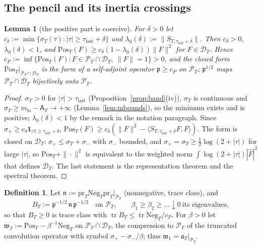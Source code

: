 \documentclass[11pt]{amsart}
\newtheorem{lemma}[theorem]{Lemma}
\theoremstyle{definition}
\newtheorem{definition}[theorem]{Definition}
\theoremstyle{remark}
\newcommand{\PT}{\mathcal P_T}
\newcommand{\sT}{\sigma_T}
\newcommand{\Fh}{\widehat F}
\newcommand{\Aconst}{\mathsf A_T}
\begin{document}
\subsection{The pencil and its inertia crossings}\label{subsec:wh-pencil}

\begin{lemma}[the positive part is coercive]\label{lem:wh-cP}
For $\delta>0$ let $c_\delta:=\min\{\sT(\tau):|\tau|\ge\tau_{\mathrm{last}}+\delta\}$ and
$\lambda_0(\delta):=\|S_{T,\tau_{\mathrm{last}}+\delta}\|$. Then $c_\delta>0$, $\lambda_0(\delta)<1$, and
$\mathrm{Pos}_T(F)\ge c_\delta(1-\lambda_0(\delta))\|F\|^2$ for $F\in\mathcal D_T$. Hence
$c_P:=\inf\{\mathrm{Pos}_T(F):F\in\PT\cap\mathcal D_T,\ \|F\|=1\}>0$, and the closed form $\mathrm{Pos}_T|_{\PT\cap\mathcal D_T}$
is the form of a self-adjoint operator $\mathfrak p\ge c_P$ on $\PT$; $\mathfrak p^{1/2}$ maps $\PT\cap\mathcal D_T$
bijectively onto $\PT$.
\end{lemma}

\begin{proof}
$\sT>0$ for $|\tau|>\tau_{\mathrm{last}}$ (Proposition~\ref{prop:band}(iv)), $\sT$ is continuous and
$\sT\ge m_{\mathrm{lo}}-\Aconst\to+\infty$ (Lemma~\ref{lem:mbounds}), so the minimum exists and is positive;
$\lambda_0(\delta)<1$ by the remark in the notation paragraph. Since
$\sigma_+\ge c_\delta\mathbf 1_{|\tau|\ge\tau_{\mathrm{last}}+\delta}$,
$\mathrm{Pos}_T(F)\ge c_\delta(\|F\|^2-\langle S_{T,\tau_{\mathrm{last}}+\delta}F,F\rangle)$. The form is closed on
$\mathcal D_T$: $\sigma_+\le\sT+\sigma_-$ with $\sigma_-$ bounded, and $\sigma_+=\sT\ge\frac12\log(2+|\tau|)$ for large
$|\tau|$, so $\mathrm{Pos}_T+\|\cdot\|^2$ is equivalent to the weighted norm $\int\log(2+|\tau|)|\Fh|^2$ that defines
$\mathcal D_T$. The last statement is the representation theorem and the spectral theorem.
\end{proof}

\begin{definition}\label{def:wh-B}
Let $\mathfrak n:=\mathrm{pr}_T\mathrm{Neg}_T\mathrm{pr}_T|_{\PT}$ (nonnegative, trace class), and
\[
B_T:=\mathfrak p^{-1/2}\,\mathfrak n\,\mathfrak p^{-1/2}\quad\text{on }\PT,\qquad
\beta_1\ge\beta_2\ge\dots\downarrow0\ \text{its eigenvalues},
\]
so that $B_T\ge0$ is trace class with $\operatorname{tr}B_T\le\operatorname{tr}\mathrm{Neg}_T/c_P$. For $\beta>0$ let
$\mathfrak w_\beta:=\mathrm{Pos}_T-\beta^{-1}\mathrm{Neg}_T$ on $\PT\cap\mathcal D_T$, the compression to $\PT$ of the
truncated convolution operator with symbol $\sigma_+-\sigma_-/\beta$; thus $\mathfrak w_1=\mathfrak a_T|_{\PT}$.
\end{definition}
\end{document}
